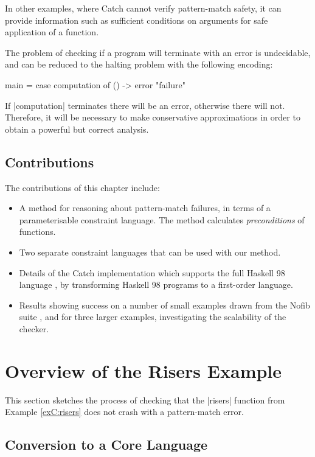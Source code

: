 In other examples, where Catch cannot verify pattern-match safety, it can provide information such as sufficient conditions on arguments for safe application of a function.

The problem of checking if a program will terminate with an error is undecidable, and can be reduced to the halting problem \cite{turing:halting} with the following encoding:

\begin{code}
main = case  computation of
             () -> error "failure"
\end{code}

If |computation| terminates there will be an error, otherwise there will not. Therefore, it will be necessary to make conservative approximations in order to obtain a powerful but correct analysis.

\subsection{Contributions}

The contributions of this chapter include:

\begin{itemize}
\item A method for reasoning about pattern-match failures, in terms of a parameterisable constraint language. The method calculates \textit{preconditions} of functions.
\item Two separate constraint languages that can be used with our method.
\item Details of the Catch implementation which supports the full Haskell 98 language \cite{haskell}, by transforming Haskell 98 programs to a first-order language.
\item Results showing success on a number of small examples drawn from the Nofib suite \cite{nofib}, and for three larger examples, investigating the scalability of the checker.
\end{itemize}


\section{Overview of the Risers Example}
\label{secC:walkthrough}

This section sketches the process of checking that the |risers| function from Example \ref{exC:risers} does not crash with a pattern-match error.


\subsection{Conversion to a Core Language}


